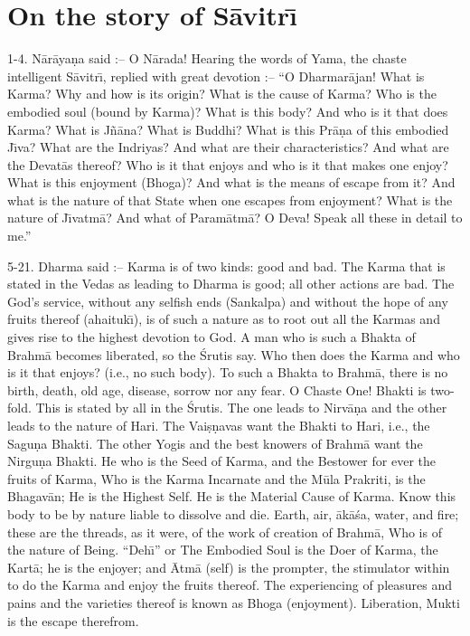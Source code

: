 \chapter{On the story of S\=avitr\={\i}}

1-4. N\=ar\=aya\d{n}a said :-- O N\=arada! Hearing the words of Yama, the chaste intelligent S\=avitr\={\i}, replied with great devotion :-- ``O Dharmar\=ajan! What is Karma? Why and how is its origin? What is the cause of Karma? Who is the embodied soul (bound by Karma)? What is this body? And who is it that does Karma? What is J\~n\=ana? What is Buddhi? What is this Pr\=a\d{n}a of this embodied J\={\i}va? What are the Indriyas? And what are their characteristics? And what are the Devat\=as thereof? Who is it that enjoys and who is it that makes one enjoy? What is this enjoyment (Bhoga)? And what is the means of escape from it? And what is the nature of that State when one escapes from enjoyment? What is the nature of J\={\i}vatm\=a? And what of Param\=atm\=a? O Deva! Speak all these in detail to me.''

5-21. Dharma said :-- Karma is of two kinds: good and bad. The Karma that is stated in the Vedas as leading to Dharma is good; all other actions are bad. The God's service, without any selfish ends (Sankalpa) and without the hope of any fruits thereof (ahaituk\={\i}), is of such a nature as to root out all the Karmas and gives rise to the highest devotion to God. A man who is such a Bhakta of Brahm\=a becomes liberated, so the \'Srutis say. Who then does the Karma and who is it that enjoys? (i.e., no such body). To such a Bhakta to Brahm\=a, there is no birth, death, old age, disease, sorrow nor any fear. O Chaste One! Bhakti is two-fold. This is stated by all in the \'Srutis. The one leads to Nirv\=a\d{n}a and the other leads to the nature of Hari. The Vai\d{s}\d{n}avas want the Bhakti to Hari, i.e., the Sagu\d{n}a Bhakti. The other Yogis and the best knowers of Brahm\=a want the Nirgu\d{n}a Bhakti. He who is the Seed of Karma, and the Bestower for ever the fruits of Karma, Who is the Karma Incarnate and the M\=ula Prakriti, is the Bhagav\=an; He is the Highest Self. He is the Material Cause of Karma. Know this body to be by nature liable to dissolve and die. Earth, air, \=ak\=a\'sa, water, and fire; these are the threads, as it were, of the work of creation of Brahm\=a, Who is of the nature of Being. ``Deh\={\i}'' or The Embodied Soul is the Doer of Karma, the Kart\=a; he is the enjoyer; and \=Atm\=a (self) is the prompter, the stimulator within to do the Karma and enjoy the fruits thereof. The experiencing of pleasures and pains and the varieties thereof is known as Bhoga (enjoyment). Liberation, Mukti is the escape therefrom.

